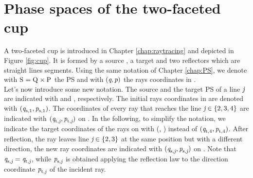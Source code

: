 \section{Phase spaces of the two-faceted cup}\label{sec:cup_raymapping}
A two-faceted cup is introduced in Chapter \ref{chap:raytracing} and depicted in Figure \ref{fig:cup}. It is formed by a source , a target  and two reflectors which are straight lines segments. 
Using the same notation of Chapter \ref{chap:PS}, we denote with $\mbox{$\textup{S}_{\textit{}}$}=\mbox{$\textup{Q}_{\textit{}}$}\times\mbox{$\textup{P}_{\textit{}}$}$ the PS and with 
$(\textit{q}, \textit{p})$ the rays coordinates in .\\ \indent
Let's now introduce some new notation. 
The source and the target PS of a line $\textit{j}$ are indicated with  and , respectively. The initial rays coordinates in  are denoted with $(\textit{q}_{\textrm{s,} \textit{$1$}}, \textit{p}_{\textrm{s,} \textit{$1$}})$.
The coordinates of every ray that reaches the line $\textit{j}\in\{2, 3, 4\}$ are indicated  with $(\textit{q}_{\textrm{t,} \textit{\textit{j}}}, \textit{p}_{\textrm{t,} \textit{\textit{j}}})$ on . 
In the following, to simplify the notation, we indicate the target coordinates of the rays on  with (, ) instead of $(\textit{q}_{\textrm{t,} \textit{$4$}}, \textit{p}_{\textrm{t,} \textit{$4$}})$.
After reflection, the ray leaves line $\textit{j} \in\{2, 3\}$ at the same position but with a different direction, the new ray coordinates are indicated with 
$(\textit{q}_{\textrm{s,} \textit{\textit{j}}}, \textit{p}_{\textrm{s,} \textit{\textit{j}}})$ on . 
Note that $\textit{q}_{\textrm{s,} \textit{\textit{j}}}= \textit{q}_{\textrm{t,} \textit{\textit{j}}}$, while $\textit{p}_{\textrm{s,} \textit{\textit{j}}}$ is obtained applying the reflection law to the direction coordinate $\textit{p}_{\textrm{t,} \textit{\textit{j}}}$ of the incident ray.

